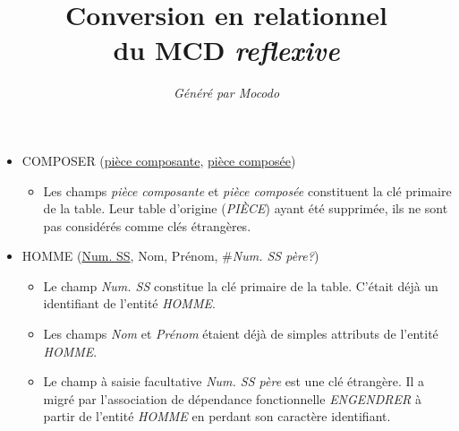 \documentclass[a4paper]{article}
\title{Conversion en relationnel\\du MCD \emph{reflexive}}
\author{\emph{Généré par Mocodo}}
\newcommand{\relat}[1]{\textsc{#1}}
\newcommand{\attr}[1]{#1}
\newcommand{\prim}[1]{\uline{#1}}
\newcommand{\foreign}[1]{\#\textsl{#1}}
\begin{document}
\maketitle

\begin{itemize}
  \item \relat{COMPOSER} (\prim{pièce composante}, \prim{pièce composée})
  \begin{itemize}
    \item Les champs \emph{pièce composante} et \emph{pièce composée} constituent la clé primaire de la table. Leur table d'origine (\emph{PIÈCE}) ayant été supprimée, ils ne sont pas considérés comme clés étrangères.
  \end{itemize}

  \item \relat{HOMME} (\prim{Num. SS}, \attr{Nom}, \attr{Prénom}, \foreign{Num. SS père?})
  \begin{itemize}
    \item Le champ \emph{Num. SS} constitue la clé primaire de la table. C'était déjà un identifiant de l'entité \emph{HOMME}.
    \item Les champs \emph{Nom} et \emph{Prénom} étaient déjà de simples attributs de l'entité \emph{HOMME}.
    \item Le champ à saisie facultative \emph{Num. SS père} est une clé étrangère. Il a migré par l'association de dépendance fonctionnelle \emph{ENGENDRER} à partir de l'entité \emph{HOMME} en perdant son caractère identifiant.
  \end{itemize}

\end{itemize}
\end{document}
